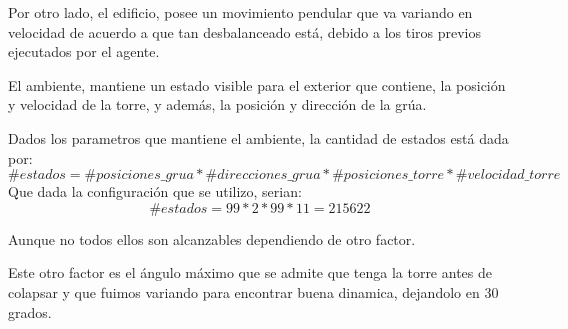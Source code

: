 \documentclass[11pt, a4paper]{article}
\begin{document}
Por otro lado, el edificio, posee un movimiento pendular que va variando en velocidad de acuerdo a que tan desbalanceado est\'a, debido a los tiros previos ejecutados por el agente. 

El ambiente, mantiene un estado visible para el exterior que contiene, la posici\'on y velocidad de la torre, y adem\'as, la posici\'on y direcci\'on de la gr\'ua. 

Dados los parametros que mantiene el ambiente, la cantidad de estados est\'a dada por:
$$ \#estados = \#posiciones\_grua * \#direcciones\_grua * \#posiciones\_torre *  \#velocidad\_torre  $$
Que dada la configuraci\'on que se utilizo, serian:
$$ \# estados = 99 * 2 *99 * 11 = 215622 $$

Aunque no todos ellos son alcanzables dependiendo de otro factor. 

Este otro factor es el \'angulo m\'aximo que se admite que tenga la torre antes de colapsar y que fuimos variando para encontrar buena dinamica, dejandolo en 30 grados. 
\end{document}
